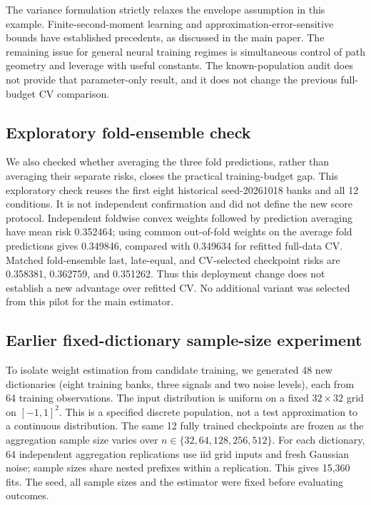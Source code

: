 \documentclass[pdflatex,sn-mathphys-ay]{sn-jnl}
\theoremstyle{remark}\newtheorem{remark}[theorem]{Remark}
\begin{document}
The variance formulation strictly relaxes the envelope assumption in this example. Finite-second-moment learning and approximation-error-sensitive bounds have established precedents, as discussed in the main paper. The remaining issue for general neural training regimes is simultaneous control of path geometry and leverage with useful constants. The known-population audit does not provide that parameter-only result, and it does not change the previous full-budget CV comparison.

\subsection{Exploratory fold-ensemble check}
We also checked whether averaging the three fold predictions, rather than averaging their separate risks, closes the practical training-budget gap. This exploratory check reuses the first eight historical seed-20261018 banks and all 12 conditions. It is not independent confirmation and did not define the new score protocol. Independent foldwise convex weights followed by prediction averaging have mean risk 0.352464; using common out-of-fold weights on the average fold predictions gives 0.349846, compared with 0.349634 for refitted full-data CV. Matched fold-ensemble last, late-equal, and CV-selected checkpoint risks are 0.358381, 0.362759, and 0.351262. Thus this deployment change does not establish a new advantage over refitted CV. No additional variant was selected from this pilot for the main estimator.

\subsection{Earlier fixed-dictionary sample-size experiment}
To isolate weight estimation from candidate training, we generated 48 new dictionaries (eight training banks, three signals and two noise levels), each from 64 training observations. The input distribution is uniform on a fixed $32\times32$ grid on $[-1,1]^2$. This is a specified discrete population, not a test approximation to a continuous distribution. The same 12 fully trained checkpoints are frozen as the aggregation sample size varies over $n\in\{32,64,128,256,512\}$. For each dictionary, 64 independent aggregation replications use iid grid inputs and fresh Gaussian noise; sample sizes share nested prefixes within a replication. This gives 15,360 fits. The seed, all sample sizes and the estimator were fixed before evaluating outcomes.
\end{document}
